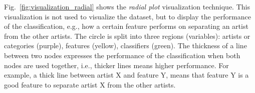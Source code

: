 Fig.~\ref{fig:visualization_radial} shows the \textit{radial plot} visualization technique.
This visualization is not used to visualize the dataset, but to display the performance of the classification, e.g., how a certain feature performs on separating an artist from the other artists.
The circle is split into three regions (variables): artists or categories (purple), features (yellow), classifiers (green).
The thickness of a line between two nodes expresses the performance of the classification when both nodes are used together, i.e., thicker lines means higher performance.
For example, a thick line between artist X and feature Y, means that feature Y is a good feature to separate artist X from the other artists.
